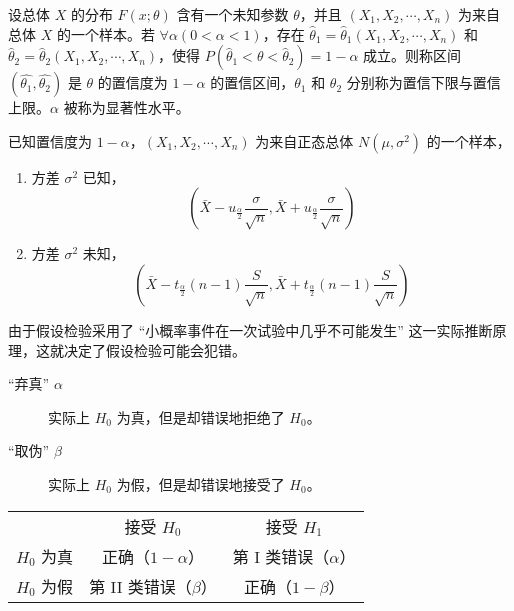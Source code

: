 \documentclass{ctexbook}
\begin{document}
\begin{definition}[置信区间]
    设总体 $X$ 的分布 $F(x;\theta)$ 含有一个未知参数 $\theta$，并且 $(X_1,X_2,\cdots,X_n)$ 为来自总体 $X$ 的一个样本。若 $\forall\alpha(0<\alpha<1)$，存在 $\hat{\theta}_1=\hat{\theta}_1(X_1,X_2,\cdots,X_n)$ 和 $\hat{\theta}_2=\hat{\theta}_2(X_1,X_2,\cdots,X_n)$，使得 $P(\hat{\theta}_1<\theta<\hat{\theta}_2)=1-\alpha$ 成立。则称区间 $(\hat{\theta_1},\hat{\theta_2})$ 是 $\theta$ 的置信度为 $1-\alpha$ 的置信区间，$\theta_1$ 和 $\theta_2$ 分别称为置信下限与置信上限。$\alpha$ 被称为显著性水平。
\end{definition}

\begin{proposition}
    已知置信度为 $1-\alpha$，$(X_1,X_2,\cdots,X_n)$ 为来自正态总体 $N(\mu,\sigma^2)$ 的一个样本，
    \begin{enumerate}
        \item 方差 $\sigma^2$ 已知，
        \begin{equation}
            \left(\bar{X}-u_{\frac{\alpha}{2}}\frac{\sigma}{\sqrt{n}},\bar{X}+u_{\frac{\alpha}{2}}\frac{\sigma}{\sqrt{n}}\right)
        \end{equation}
        \item 方差 $\sigma^2$ 未知，
        \begin{equation}
            \left(\bar{X}-t_{\frac{\alpha}{2}}(n-1)\frac{S}{\sqrt{n}},\bar{X}+t_{\frac{\alpha}{2}}(n-1)\frac{S}{\sqrt{n}}\right)
        \end{equation}
    \end{enumerate}
\end{proposition}

\begin{definition}[两类错误]
    由于假设检验采用了 “小概率事件在一次试验中几乎不可能发生” 这一实际推断原理，这就决定了假设检验可能会犯错。
    \begin{description}
        \item[“弃真” $\alpha$] 实际上 $H_0$ 为真，但是却错误地拒绝了 $H_0$。
        \item[“取伪” $\beta$] 实际上 $H_0$ 为假，但是却错误地接受了 $H_0$。
    \end{description}
    
    \begin{tabular}{ccc}
         & 接受 $H_0$ & 接受 $H_1$ \\
        $H_0$ 为真 & 正确（$1-\alpha$） & 第 I 类错误（$\alpha$） \\
        $H_0$ 为假 & 第 II 类错误（$\beta$） & 正确（$1-\beta$）
    \end{tabular}
\end{definition}
\end{document}
